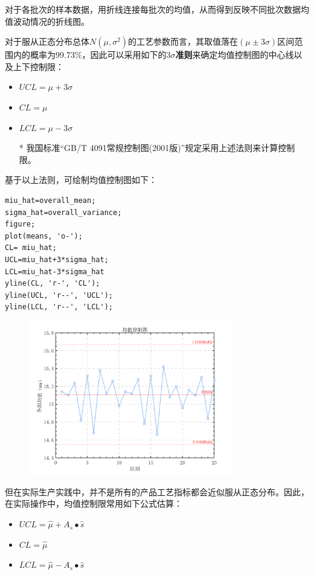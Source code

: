 \documentclass[12pt]{article}  %
\begin{document}
对于各批次的样本数据，用折线连接每批次的均值，从而得到反映不同批次数据均值波动情况的折线图。

对于服从正态分布总体$N(\mu,\sigma^2)$的工艺参数而言，其取值落在$(\mu \pm 3\sigma)$区间范围内的概率为99.73\%，因此可以采用如下的\textbf{$3\sigma$准则}来确定均值控制图的中心线以及上下控制限：

\begin{itemize}
	\setlength{\parsep}{0ex} %
	\setlength{\topsep}{2ex} %
	\setlength{\itemsep}{1ex} %
	\item $UCL=\mu+3\sigma$
	\item $CL=\mu$ 
	\item $LCL=\mu-3\sigma$
	
	* 我国标准“GB/T 4091常规控制图(2001版)”规定采用上述法则来计算控制限。
\end{itemize}

基于以上法则，可绘制均值控制图如下：
\begin{lstlisting}
miu_hat=overall_mean;
sigma_hat=overall_variance;
figure;
plot(means, 'o-');
CL= miu_hat;
UCL=miu_hat+3*sigma_hat;
LCL=miu_hat-3*sigma_hat
yline(CL, 'r-', 'CL');
yline(UCL, 'r--', 'UCL');
yline(LCL, 'r--', 'LCL');
\end{lstlisting}

\begin{figure}[H]
	\centering
	\includegraphics[width=0.8\textwidth]{2.png}
\end{figure}

但在实际生产实践中，并不是所有的产品工艺指标都会近似服从正态分布。因此，在实际操作中，均值控制限常用如下公式估算：

\begin{itemize}
	\setlength{\parsep}{0ex} %
	\setlength{\topsep}{2ex} %
	\setlength{\itemsep}{1ex} %
	\item $UCL=\hat{\mu}+A_s\bullet \hat{s}$
	\item $CL=\hat{\mu}$ 
	\item $LCL=\hat{\mu}-A_s\bullet \hat{s}$
\end{itemize}
\end{document}
